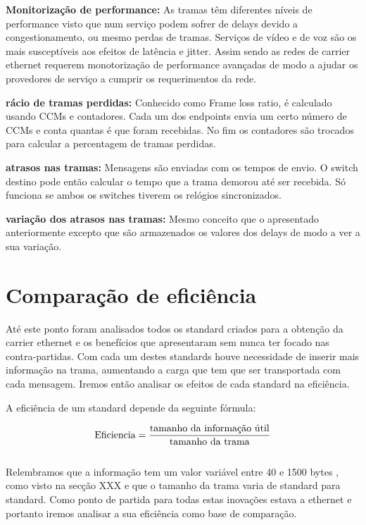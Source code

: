 \documentclass[a4paper]{IEEEtran}
\begin{document}
\textbf{Monitorização de performance:} As tramas têm diferentes níveis de performance visto que num serviço podem sofrer de delays devido a congestionamento, ou mesmo perdas de tramas. Serviços de vídeo e de voz são os mais susceptíveis  aos efeitos de latência e jitter. Assim sendo as redes de carrier ethernet requerem monotorização de performance avançadas de modo a ajudar os provedores de serviço a cumprir os requerimentos da rede. 

\textbf{rácio de tramas perdidas:} Conhecido como Frame loss ratio, é calculado usando CCMs e contadores. Cada um dos endpoints envia um certo número de CCMs e conta quantas é que foram recebidas. No fim os contadores são trocados para calcular a percentagem de tramas perdidas.

\textbf{atrasos nas tramas:} Mensagens são enviadas com os tempos de envio. O switch destino pode então calcular o tempo que a trama demorou até ser recebida. Só funciona se ambos os switches tiverem os relógios sincronizados.

\textbf{ variação dos atrasos nas tramas:} Mesmo conceito que o apresentado anteriormente excepto que são armazenados os valores dos delays de modo a ver a sua variação.
  

 
\section{Comparação de eficiência}
\label{sec:eficiencia}

Até este ponto foram analisados todos os standard criados para a obtenção da carrier ethernet e os benefícios que apresentaram sem nunca ter focado nas contra-partidas. Com cada um destes standards houve necessidade de inserir mais informação na trama, aumentando a carga que tem que ser transportada com cada mensagem. Iremos então analisar os efeitos de cada standard na eficiência. 

A eficiência de um standard depende da seguinte fórmula: 

\begin{equation}
	\label{eq:problem}
	 \text {Eficiencia} = \frac{\text{tamanho  da informação útil}}{ \text{tamanho da trama}} \\ 
\end{equation}\\

Relembramos que a informação tem um valor variável entre 40 e 1500 bytes , como visto na secção XXX e que o tamanho da trama varia de standard para standard.
Como ponto de partida para todas estas inovações estava a ethernet e portanto iremos analisar a sua eficiência como base de comparação. 
\end{document}
